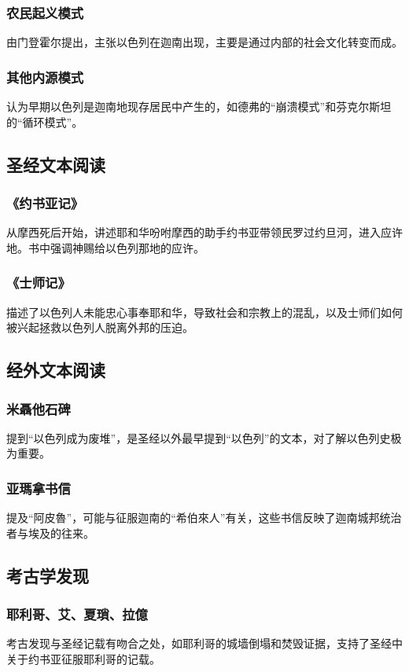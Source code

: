 \documentclass[12pt, a4paper]{ctexart}
\begin{document}
\subsubsection{农民起义模式}
由门登霍尔提出，主张以色列在迦南出现，主要是通过内部的社会文化转变而成。
\subsubsection{其他内源模式}
认为早期以色列是迦南地现存居民中产生的，如德弗的“崩溃模式”和芬克尔斯坦的“循环模式”。

\subsection{圣经文本阅读}
\subsubsection{《约书亚记》}
从摩西死后开始，讲述耶和华吩咐摩西的助手约书亚带领民罗过约旦河，进入应许地。书中强调神赐给以色列那地的应许。
\subsubsection{《士师记》}
描述了以色列人未能忠心事奉耶和华，导致社会和宗教上的混乱，以及士师们如何被兴起拯救以色列人脱离外邦的压迫。

\subsection{经外文本阅读}
\subsubsection{米聶他石碑}
提到“以色列成为废堆”，是圣经以外最早提到“以色列”的文本，对了解以色列史极为重要。
\subsubsection{亚瑪拿书信}
提及“阿皮魯”，可能与征服迦南的“希伯來人”有关，这些书信反映了迦南城邦统治者与埃及的往来。

\subsection{考古学发现}
\subsubsection{耶利哥、艾、夏瑣、拉億}
考古发现与圣经记载有吻合之处，如耶利哥的城墙倒塌和焚毁证据，支持了圣经中关于约书亚征服耶利哥的记载。
\end{document}
